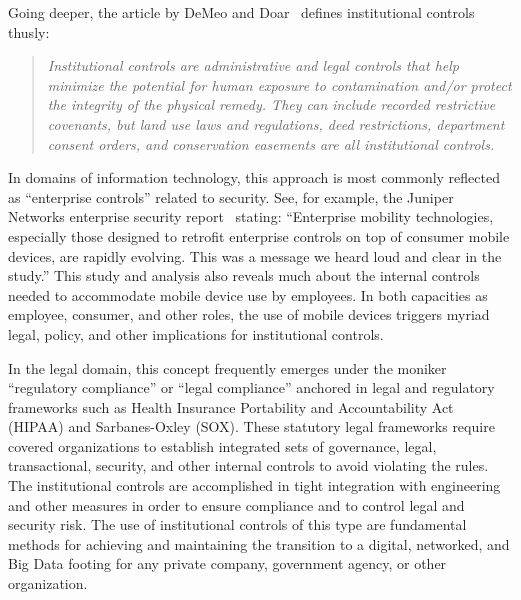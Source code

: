 Going deeper, the article by DeMeo and Doar~\cite{DeMeo2011} defines institutional controls thusly:
\begin{quote}
\emph{
Institutional controls are administrative and legal controls that help minimize the potential for human exposure to contamination and/or protect the integrity of the physical remedy. They can include recorded restrictive covenants, but land use laws and regulations, deed restrictions, department consent orders, and conservation easements are all institutional controls.
}
\end{quote}

In domains of information technology, this approach is most commonly reflected as ``enterprise controls'' related to security.
See, for example, the Juniper Networks enterprise security report~\cite{Juniper2012} stating: ``Enterprise mobility technologies, especially those designed to retrofit enterprise controls on top of consumer mobile devices, are rapidly evolving. This was a message we heard loud and clear in the study.''
This study and analysis also reveals much about the internal controls needed to accommodate mobile device use by employees.
In both capacities as employee, consumer, and other roles, the use of mobile devices triggers myriad legal, policy, and other implications for institutional controls.

In the legal domain, this concept frequently emerges under the moniker ``regulatory compliance'' or ``legal compliance'' anchored in legal and regulatory frameworks such as Health Insurance Portability and Accountability Act (HIPAA) and Sarbanes-Oxley (SOX).
These statutory legal frameworks require covered organizations to establish integrated sets of governance, legal, transactional, security, and other internal controls to avoid violating the rules.
The institutional controls are accomplished in tight integration with engineering and other measures in order to ensure compliance and to control legal and security risk.
The use of institutional controls of this type are fundamental methods for achieving and maintaining the transition to a digital, networked, and Big Data footing for any private company, government agency, or other organization.

